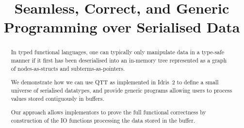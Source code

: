 \documentclass[10pt]{article}
\title{Seamless, Correct, and Generic \\ Programming over Serialised Data}
\author{\iftoggle{BLIND}{ANONYMOUS}{Guillaume Allais}}
\newcommand{\idris}{Idris~2}
\begin{document}
\maketitle

\begin{abstract}
In typed functional languages, one can typically only manipulate data
in a type-safe manner if it first has been deserialised into an in-memory
tree represented as a graph of nodes-as-structs and subterms-as-pointers.

We demonstrate how we can use QTT as implemented in \idris{} to define
a small universe of serialised datatypes, and provide generic programs
allowing users to process values stored contiguously in buffers.

Our approach allows implementors to prove the full functional
correctness by construction of the IO functions processing the
data stored in the buffer.
\end{abstract}




















\newpage


\newpage
\appendix



\end{document}

